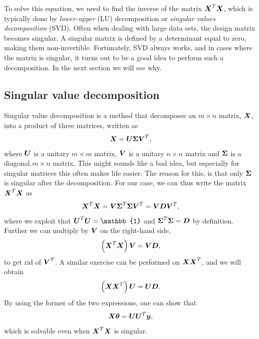 To solve this equation, we need to find the inverse of the matrix $\boldsymbol{{X}}^T\boldsymbol{{X}}$, which is typically done by \textit{lower-upper} (LU) decomposition or \textit{singular values decomposition} (SVD). Often when dealing with large data sets, the design matrix becomes singular. A singular matrix is defined by a determinant equal to zero, making them non-invertible. Fortunately, SVD always works, and in cases where the matrix is singular, it turns out to be a good idea to perform such a decomposition. In the next section we will see why.

\subsection{Singular value decomposition}
Singular value decomposition is a method that decomposes an $m\times n$ matrix, $\boldsymbol{{X}}$, into a product of three matrices, written as
\begin{equation}
\boldsymbol{{X}}=\boldsymbol{{U}}\boldsymbol{{\Sigma}}\boldsymbol{{V}}^T,
\end{equation}
where $\boldsymbol{{U}}$ is a unitary $m\times m$ matrix, $\boldsymbol{{V}}$ is a unitary $n\times n$ matrix and $\boldsymbol{{\Sigma}}$ is a diagonal $m\times n$ matrix. This might sounds like a bad idea, but especially for singular matrices this often makes life easier. The reason for this, is that only $\boldsymbol{{\Sigma}}$ is singular after the decomposition. For our case, we can thus write the matrix $\boldsymbol{{X}}^T\boldsymbol{{X}}$ as 
\begin{equation}
\boldsymbol{{X}}^T\boldsymbol{{X}}=\boldsymbol{{V}}\boldsymbol{{\Sigma}}^T\boldsymbol{{\Sigma}}\boldsymbol{{V}}^T=\boldsymbol{{V}}\boldsymbol{{D}}\boldsymbol{{V}}^T,
\end{equation}
where we exploit that $\bs{U}^T\bs{U}=\mathbb{1}$ and $\boldsymbol{{\Sigma}}^T\boldsymbol{{\Sigma}}=\boldsymbol{{D}}$ by definition. Further we can multiply by $\boldsymbol{{V}}$ on the right-hand side,
\begin{equation}
\left(\boldsymbol{{X}}^T\boldsymbol{{X}}\right)\boldsymbol{{V}}=\boldsymbol{{V}}\boldsymbol{{D}},
\end{equation}
to get rid of $\boldsymbol{{V}}^T$. A similar exercise can be performed on $\boldsymbol{{X}}\boldsymbol{{X}}^T$, and we will obtain
\begin{equation}
\left(\boldsymbol{{X}}\boldsymbol{{X}}^T\right)\boldsymbol{{U}}=\boldsymbol{{U}}\boldsymbol{{D}}.
\end{equation}
By using the former of the two expressions, one can show that
\begin{equation}
\boldsymbol{{X}}\boldsymbol{{\theta}}=\boldsymbol{{U}}\boldsymbol{{U}}^T\boldsymbol{{y}},
\end{equation}
which is solvable even when $\boldsymbol{{X}}^T\boldsymbol{{X}}$ is singular.

